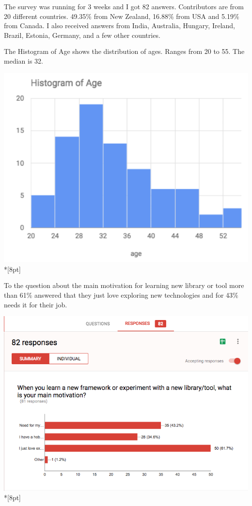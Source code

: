 \documentclass[12pt, a4paper, oneside, openright, medskipamount]{report}
\begin{document}
The survey was running for 3 weeks and I got 82 answers. Contributors are from 20 different countries. 49.35\% from New Zealand, 16.88\% from USA and 5.19\% from Canada. I also received answers from India, Australia, Hungary, Ireland, Brazil, Estonia, Germany, and a few other countries.

The Histogram of Age shows the distribution of ages. Ranges from 20 to 55. The median is 32.

\includegraphics[width=1\textwidth]{assets/survey-result/histogram-of-age.png}\\*[8pt]

To the question about the main motivation for learning new library or tool more than 61\% answered that they just love exploring new technologies and for 43\% needs it for their job.

\includegraphics[width=1\textwidth]{assets/survey-result/main-motivation.png}\\*[8pt]
\end{document}
